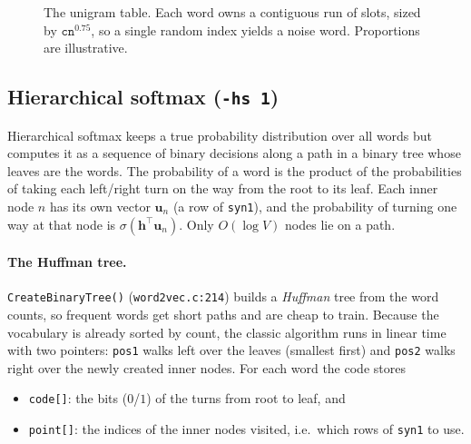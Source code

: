 \documentclass[11pt,a4paper]{article}
\newcommand{\code}[1]{\texttt{#1}}
\newcommand{\src}[1]{\texttt{word2vec.c:#1}}
\newcommand{\vout}{\mathbf{u}}
\begin{document}
\begin{figure}[ht]
\centering
{}
\caption{The unigram table. Each word owns a contiguous run of slots, sized by
$\code{cn}^{0.75}$, so a single random index yields a noise word. Proportions are illustrative.}
\label{fig:table}
\end{figure}

\subsection{Hierarchical softmax (\texttt{-hs 1})}

Hierarchical softmax keeps a true probability distribution over all words but
computes it as a sequence of binary decisions along a path in a binary tree whose
leaves are the words. The probability of a word is the product of the
probabilities of taking each left/right turn on the way from the root to its leaf. Each
inner node $n$ has its own vector $\vout_n$ (a row of \code{syn1}), and the
probability of turning one way at that node is $\sigma(\mathbf{h}^{\top}\vout_n)$.
Only $O(\log V)$ nodes lie on a path.

\paragraph{The Huffman tree.}
\code{CreateBinaryTree()} (\src{214}) builds a \emph{Huffman} tree from the word
counts, so frequent words get short paths and are cheap to train. Because the
vocabulary is already sorted by count, the classic algorithm runs in linear time with
two pointers: \code{pos1} walks left over the leaves (smallest first) and
\code{pos2} walks right over the newly created inner nodes. For each word the
code stores
\begin{itemize}[nosep]
  \item \code{code[]}: the bits ($0$/$1$) of the turns from root to leaf, and
  \item \code{point[]}: the indices of the inner nodes visited, i.e.\ which rows of
        \code{syn1} to use.
\end{itemize}
\end{document}
